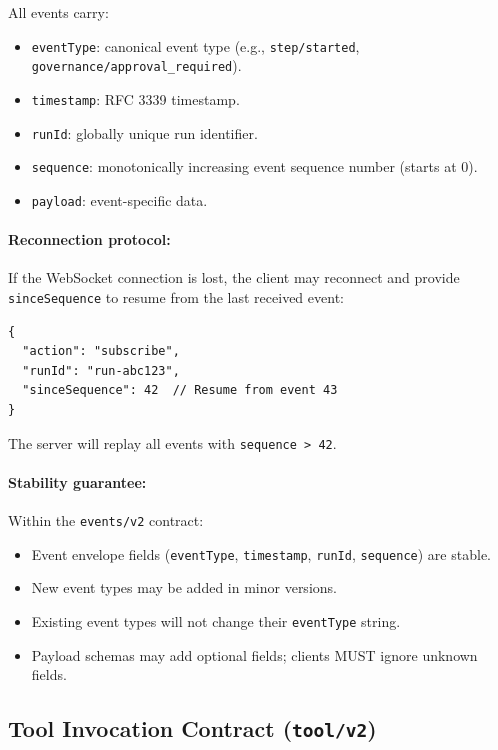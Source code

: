 All events carry:

\begin{itemize}
  \item \texttt{eventType}: canonical event type (e.g.,
        \texttt{step/started}, \texttt{governance/approval\_required}).
  \item \texttt{timestamp}: RFC 3339 timestamp.
  \item \texttt{runId}: globally unique run identifier.
  \item \texttt{sequence}: monotonically increasing event sequence number
        (starts at 0).
  \item \texttt{payload}: event-specific data.
\end{itemize}

\paragraph{Reconnection protocol:}

If the WebSocket connection is lost, the client may reconnect and provide
\texttt{sinceSequence} to resume from the last received event:

\begin{verbatim}
{
  "action": "subscribe",
  "runId": "run-abc123",
  "sinceSequence": 42  // Resume from event 43
}
\end{verbatim}

The server will replay all events with \texttt{sequence > 42}.

\paragraph{Stability guarantee:}

Within the \texttt{events/v2} contract:

\begin{itemize}
  \item Event envelope fields (\texttt{eventType}, \texttt{timestamp},
        \texttt{runId}, \texttt{sequence}) are stable.
  \item New event types may be added in minor versions.
  \item Existing event types will not change their \texttt{eventType} string.
  \item Payload schemas may add optional fields; clients MUST ignore unknown
        fields.
\end{itemize}

\subsection{Tool Invocation Contract (\texttt{tool/v2})}
\label{sec:tool-invocation-contract}

